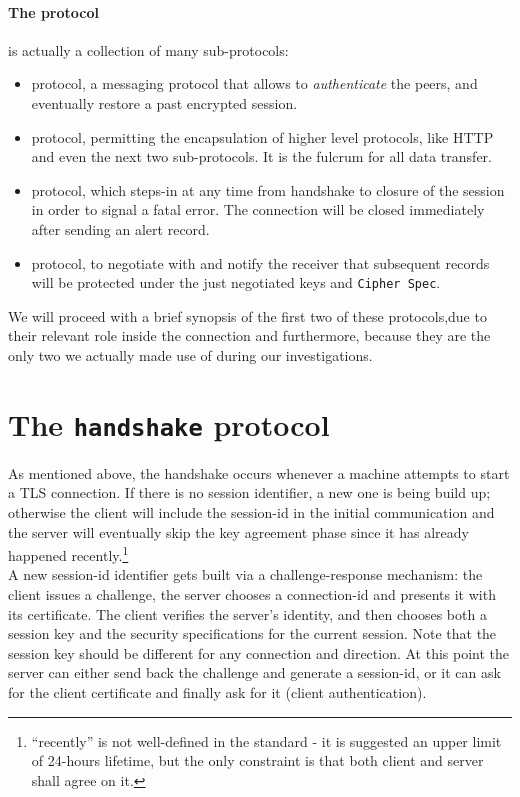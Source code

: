 \paragraph{The protocol} is actually a collection of many sub-protocols:
\begin{itemize}
  \setlength{\itemsep}{1pt}
  \setlength{\parskip}{0pt}
  \setlength{\parsep}{0pt}
\item {} protocol, a messaging protocol that allows to
  \emph{authenticate} the peers, and eventually restore a past encrypted
  session.
\item {} protocol, permitting the encapsulation of higher level protocols,
  like HTTP and even the next two sub-protocols. It is the fulcrum for all data
  transfer.
\item {} protocol, which steps-in at any time from handshake to closure of the
  session in order to signal a fatal error. The connection will be closed
  immediately after sending an alert record.
\item {} protocol, to negotiate with and notify  the receiver that
  subsequent records will be protected under the just negotiated keys and
  \texttt{Cipher Spec}.
\end{itemize}
We will proceed with a brief synopsis of the first two of these protocols,due to
their relevant role inside the connection and furthermore, because they are the
only two we actually made use of during our investigations.


\section{The \texttt{handshake} protocol}
As mentioned above, the handshake occurs whenever a machine attempts to start
a TLS connection. If there is no session identifier, a new one is being build
up; otherwise the client will include the session-id in the initial
communication and the server will eventually skip the key agreement phase since
it has already happened recently.\footnote{``recently'' is not well-defined in
  the standard - it is suggested an upper limit of 24-hours lifetime, but the
  only constraint is that both client and server shall agree on it.}\\
A new session-id identifier gets built via a challenge-response mechanism: the
client issues a challenge, the server chooses a connection-id and presents it
with its certificate. The client verifies the server's identity, and then
chooses both a session key and the security specifications for the current
session. Note that the session key should be different for any connection and
direction. At this point the server can either send back the challenge and
generate a session-id, or it can ask for the client
certificate and finally ask for it (client authentication).


